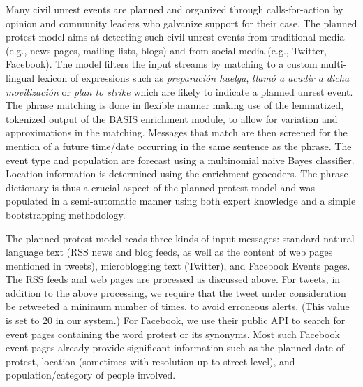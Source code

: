 Many civil unrest events are planned and organized through calls-for-action
by opinion and community leaders who galvanize support for their case.
The planned protest model aims
at detecting such civil unrest events from
traditional media (e.g., news pages, mailing
lists, blogs) and from social media (e.g., Twitter, Facebook).
The model filters the input streams by matching to a custom
multi-lingual lexicon of expressions such as {\em preparación huelga},
{\em llamó a acudir a dicha movilización} or {\em plan to strike}
which are likely to indicate a planned unrest event.  The phrase
matching is done in flexible manner making use of the lemmatized,
tokenized output of the BASIS enrichment module, to allow for variation and
approximations in the matching.  Messages that match are then screened
for the mention of a future time/date occurring in the same sentence as the
phrase. The event type and population are forecast using a multinomial naive
Bayes classifier. Location information is determined using the enrichment geocoders.
The phrase dictionary is thus a crucial aspect of the planned protest
model and was populated in a semi-automatic manner using
both expert knowledge and a simple bootstrapping methodology.

\iffalse
Initially, a few seed phrases were obtained manually
with the help of subject matter experts. These phrases were parsed
using a dependency parser and the grammatical relationship between the
core subject word---{\em protest}, {\em manifestación}, {\em Huelga},
etc.---and any accompanying word was extracted. To extend the initial
set of phrases, a set of sentences containing a subject word and a
future time/date expression was collected and parsed.  This set of
sentences was used to expand the set of planned protest phrases by
extracting all keyword combinations that have the same grammatical
relation with respect to the core subject word. The final set of
planned protest phrases is then obtained after a manual revision of
the phrases obtained in the last step. \narenc{It would be good to give
an example of this phrase growing.}
\fi
The planned protest model reads three kinds of input messages:
standard natural language text (RSS news and blog feeds, as well
as the content of web pages mentioned in tweets), microblogging text
(Twitter), and Facebook Events pages.
The RSS feeds and web pages are processed as discussed above. For
tweets, in addition to the above processing, we require that the tweet
under consideration be retweeted a minimum number of
times, to avoid erroneous alerts. (This value is set to 20
in our system.) For Facebook, we use their public API to search
for event pages containing the word protest or its synonyms.
Most such Facebook event pages already
provide significant information such as the
planned date of protest, location (sometimes with resolution up to
street level), and population/category of
people involved.

